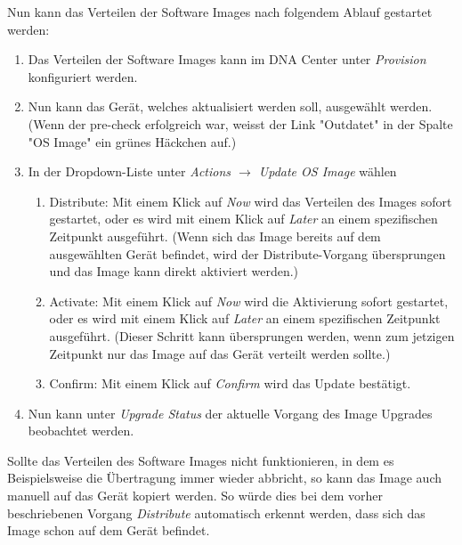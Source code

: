 Nun kann das Verteilen der Software Images nach folgendem Ablauf gestartet werden:
\begin{enumerate}
	\item Das Verteilen der Software Images kann im DNA Center unter \textit{Provision} konfiguriert werden.
	\item Nun kann das Gerät, welches aktualisiert werden soll, ausgewählt werden. (Wenn der pre-check erfolgreich war, weisst der Link "Outdatet" in der Spalte "OS Image" ein grünes Häckchen auf.)
	\item In der Dropdown-Liste unter \textit{Actions  $\rightarrow$ Update OS Image} wählen
	\begin{enumerate}
		\item Distribute: Mit einem Klick auf \textit{Now} wird das Verteilen des Images sofort gestartet, oder es wird mit einem Klick auf \textit{Later} an einem spezifischen Zeitpunkt ausgeführt. (Wenn sich das Image bereits auf dem ausgewählten Gerät befindet, wird der Distribute-Vorgang übersprungen und das Image kann direkt aktiviert werden.)
		\item Activate: Mit einem Klick auf \textit{Now} wird die Aktivierung sofort gestartet, oder es wird mit einem Klick auf \textit{Later} an einem spezifischen Zeitpunkt ausgeführt. (Dieser Schritt kann übersprungen werden, wenn zum jetzigen Zeitpunkt nur das Image auf das Gerät verteilt werden sollte.)
		\item Confirm: Mit einem Klick auf \textit{Confirm} wird das Update bestätigt.
	\end{enumerate}
	\item Nun kann unter \textit{Upgrade Status} der aktuelle Vorgang des Image Upgrades beobachtet werden.
\end{enumerate}

Sollte das Verteilen des Software Images nicht funktionieren, in dem es Beispielsweise die Übertragung immer wieder abbricht, so kann das Image auch manuell auf das Gerät kopiert werden. So würde dies bei dem vorher beschriebenen Vorgang \textit{Distribute} automatisch erkennt werden, dass sich das Image schon auf dem Gerät befindet.

